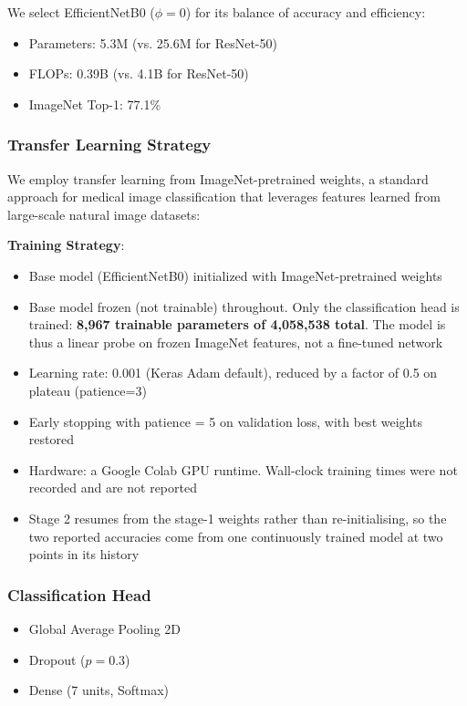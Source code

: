 \documentclass[ai,article,submit,pdftex,moreauthors]{Definitions/mdpi}
\begin{document}
We select EfficientNetB0 ($\phi = 0$) for its balance of accuracy and efficiency:
\begin{itemize}[leftmargin=*, itemsep=2pt]
    \item Parameters: 5.3M (vs. 25.6M for ResNet-50)
    \item FLOPs: 0.39B (vs. 4.1B for ResNet-50)
    \item ImageNet Top-1: 77.1\%
\end{itemize}

\subsubsection{Transfer Learning Strategy}

We employ transfer learning from ImageNet-pretrained weights, a standard approach for medical image classification that leverages features learned from large-scale natural image datasets:

\textbf{Training Strategy}:
\begin{itemize}[leftmargin=*, itemsep=2pt]
    \item Base model (EfficientNetB0) initialized with ImageNet-pretrained weights
    \item Base model frozen (not trainable) throughout. Only the classification head is trained: \textbf{8,967 trainable parameters of 4,058,538 total}. The model is thus a linear probe on frozen ImageNet features, not a fine-tuned network
    \item Learning rate: 0.001 (Keras Adam default), reduced by a factor of 0.5 on plateau (patience=3)
    \item Early stopping with patience = 5 on validation loss, with best weights restored
    \item Hardware: a Google Colab GPU runtime. Wall-clock training times were not recorded and are not reported
    \item Stage 2 resumes from the stage-1 weights rather than re-initialising, so the two reported accuracies come from one continuously trained model at two points in its history
\end{itemize}

\subsubsection{Classification Head}
\begin{itemize}[leftmargin=*, itemsep=2pt]
    \item Global Average Pooling 2D
    \item Dropout ($p = 0.3$)
    \item Dense (7 units, Softmax)
\end{itemize}
\end{document}
